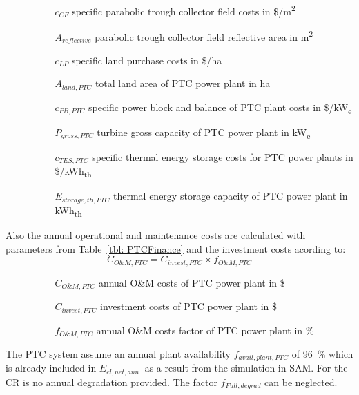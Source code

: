 \begin{itemize}
\item[ ] 
\begin{itemize}
\item[ ] 
\begin{itemize}
\item[$c_{CF}$]specific parabolic trough collector field costs in \$/m\textsuperscript{2}
\item[$A_{reflective}$]parabolic trough collector field reflective area in m\textsuperscript{2}
\item[$c_{LP}$]specific land purchase costs in \$/ha
\item[$A_{land,PTC}$]total land area of PTC power plant in ha
\item[$c_{PB,PTC}$]specific power block and balance of PTC plant costs in \$/kW\textsubscript{e}
\item[$P_{gross,PTC}$]turbine gross capacity of PTC power plant in kW\textsubscript{e}
\item[$c_{TES,PTC}$]specific thermal energy storage costs for PTC power plants in \$/kWh\textsubscript{th}
\item[$E_{storage,th,PTC}$]thermal energy storage capacity of PTC power plant in kWh\textsubscript{th}
\end{itemize}
\end{itemize}
\end{itemize}
Also the annual operational and maintenance costs are calculated with parameters from Table~\ref{tbl: PTCFinance} and the investment costs acording to:
\begin{equation}
C_{O\&M,PTC} = C_{invest,PTC} \times f_{O\&M,PTC}
\end{equation} 
\begin{itemize}
\item[ ] 
\begin{itemize}
\item[ ] 
\begin{itemize}
\item[$C_{O\&M,PTC}$]annual O\&M costs of PTC power plant in \$
\item[$C_{invest,PTC}$]investment costs of PTC power plant in \$
\item[$f_{O\&M,PTC}$]annual O\&M costs factor of PTC power plant in \%
\end{itemize}
\end{itemize}
\end{itemize}
The PTC system assume an annual plant availability $f_{avail,plant,PTC}$ of 96~\% which is already included in $E_{el,net,ann.}$ as a result from the simulation in SAM. For the CR is no annual degradation provided. The factor $f_{Full,degrad}$ can be neglected.
